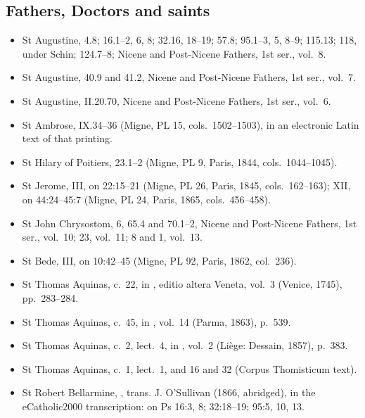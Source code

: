 {\subsection*{Fathers, Doctors and saints}
\begin{itemize}[itemsep=0pt,topsep=.25em]
\item St Augustine,  4.8; 16.1--2, 6, 8; 32.16, 18--19; 57.8; 95.1--3, 5, 8--9; 115.13; 118, under Schin; 124.7--8; Nicene and Post-Nicene Fathers, 1st ser., vol.~8.
\item St Augustine,  40.9 and 41.2, Nicene and Post-Nicene Fathers, 1st ser., vol.~7.
\item St Augustine,  II.20.70, Nicene and Post-Nicene Fathers, 1st ser., vol.~6.
\item St Ambrose,  IX.34--36 (Migne, PL 15, cols.~1502--1503), in an electronic Latin text of that printing.
\item St Hilary of Poitiers,  23.1--2 (Migne, PL 9, Paris, 1844, cols.~1044--1045).
\item St Jerome,  III, on 22:15--21 (Migne, PL 26, Paris, 1845, cols.~162--163);  XII, on 44:24--45:7 (Migne, PL 24, Paris, 1865, cols.~456--458).
\item St John Chrysostom,  6, 65.4 and 70.1--2, Nicene and Post-Nicene Fathers, 1st ser., vol.~10;  23, vol.~11;  8 and  1, vol.~13.
\item St Bede,  III, on 10:42--45 (Migne, PL 92, Paris, 1862, col.~236).
\item St Thomas Aquinas,  c.~22, in , editio altera Veneta, vol.~3 (Venice, 1745), pp.~283--284.
\item St Thomas Aquinas,  c.~45, in , vol.~14 (Parma, 1863), p.~539.
\item St Thomas Aquinas,  c.~2, lect.~4, in , vol.~2 (Li\`ege: Dessain, 1857), p.~383.
\item St Thomas Aquinas,  c.~1, lect.~1, and  16 and 32 (Corpus Thomisticum text).
\item St Robert Bellarmine, , trans. J. O'Sullivan (1866, abridged), in the eCatholic2000 transcription: on Ps 16:3, 8; 32:18--19; 95:5, 10, 13.
\end{itemize}

}
